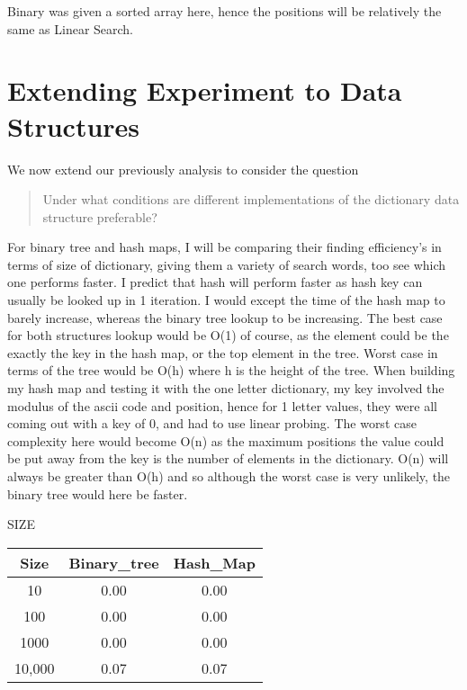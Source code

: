 \documentclass{article}
\begin{document}
Binary was given a sorted array here, hence the positions will be relatively the same as Linear Search.\newline






\section{Extending Experiment to Data Structures}
\label{sec:part3}

We now extend our previously analysis to consider the question
\begin{quote}
Under what conditions are different implementations of the dictionary data structure preferable?
\end{quote}

For binary tree and hash maps, I will be comparing their finding efficiency's in terms of size of dictionary, giving them a variety of search words, too see which one performs faster. I predict that hash will perform faster as hash key can usually be looked up in 1 iteration. I would except the time of the hash map to barely increase, whereas the binary tree lookup to be increasing. The best case for both structures lookup would be O(1) of course, as the element could be the exactly the key in the hash map, or the top element in the tree. Worst case in terms of the tree would be O(h) where h is the height of the tree. When building my hash map and testing it with the one letter dictionary, my key involved the modulus of the ascii code and position, hence for 1 letter values, they were all coming out with a key of 0, and had to use linear probing. The worst case complexity here would become O(n) as the maximum positions the value could be put away from the key is the number of elements in the dictionary. O(n) will always be greater than O(h) and so although the worst case is very unlikely, the binary tree would here be faster.\par

SIZE\newline


\begin{center}
 \begin{tabular}{||c c c||}
 \hline
 Size & Binary\_tree & Hash\_Map  \\ [0.5ex]
 \hline\hline
 10 & 0.00 & 0.00\\
 \hline
 100 & 0.00 & 0.00\\
 \hline
 1000 & 0.00 & 0.00 \\
 \hline
 10,000 & 0.07 & 0.07 \\
 \hline
\end{tabular}
\end{center}
\end{document}
